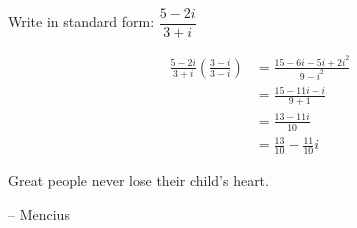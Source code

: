 \documentclass[fleqn,addpoints]{exam}
\begin{document}
\begin{questions}
\question
Write in standard form: $\dfrac{5-2i}{3+i}$

\begin{solution}
\begin{align*}
  \frac{5-2i}{3+i} \left( \frac{3-i}{3-i} \right) &= \frac{15 - 6i - 5i + 2i^2}{9 - i^2} \\
  &= \frac{15 - 11i - i}{9+1} \\
  &= \frac{13 - 11i}{10} \\
  &= \frac{13}{10} - \frac{11}{10}i
\end{align*}

\end{solution}

\end{questions}

\ifprintanswers
\else
\vspace{0.5 in}

\begin{em}
Great people never lose their child's heart.
\end{em}

\vspace{0.1 in}
\hspace{0.5 in} -- Mencius 

\fi
\end{document}
